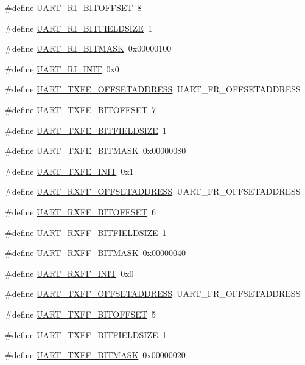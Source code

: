 \begin{DoxyCompactItemize}
\item 
\#define \hyperlink{a00575_a3c027409e7ebbc51bc2b17dec54830dd}{UART\_\-RI\_\-BITOFFSET}~8
\item 
\#define \hyperlink{a00575_a09bf31fcee8b01058706bfc98b5df5fb}{UART\_\-RI\_\-BITFIELDSIZE}~1
\item 
\#define \hyperlink{a00575_aba8c700a8cca6523600a41577cdf3c91}{UART\_\-RI\_\-BITMASK}~0x00000100
\item 
\#define \hyperlink{a00575_acadd1eb0915272c47cf080c968b84084}{UART\_\-RI\_\-INIT}~0x0
\item 
\#define \hyperlink{a00575_a3472eaebc0f1cd3d038f35aa27f2dcbf}{UART\_\-TXFE\_\-OFFSETADDRESS}~UART\_\-FR\_\-OFFSETADDRESS
\item 
\#define \hyperlink{a00575_a01a0be69fed99db0cdbe23e62605e7e4}{UART\_\-TXFE\_\-BITOFFSET}~7
\item 
\#define \hyperlink{a00575_abd6ec8c56f4c7a547fe79ffc24aaaba2}{UART\_\-TXFE\_\-BITFIELDSIZE}~1
\item 
\#define \hyperlink{a00575_af900882c4c51863f8698d414935069f3}{UART\_\-TXFE\_\-BITMASK}~0x00000080
\item 
\#define \hyperlink{a00575_a85598fcf9b8de6fd923107985ac1b7e2}{UART\_\-TXFE\_\-INIT}~0x1
\item 
\#define \hyperlink{a00575_a5336f54af78593f9929462ede1ff6dce}{UART\_\-RXFF\_\-OFFSETADDRESS}~UART\_\-FR\_\-OFFSETADDRESS
\item 
\#define \hyperlink{a00575_afa0faf78e86f805b4d07f023c760bc06}{UART\_\-RXFF\_\-BITOFFSET}~6
\item 
\#define \hyperlink{a00575_a4a26ea73ca1c8e1180add58b53280b44}{UART\_\-RXFF\_\-BITFIELDSIZE}~1
\item 
\#define \hyperlink{a00575_a73d21cf48e50db0772e2fa5d8ec11137}{UART\_\-RXFF\_\-BITMASK}~0x00000040
\item 
\#define \hyperlink{a00575_ad73017c2950a2390597cd46932a8b99e}{UART\_\-RXFF\_\-INIT}~0x0
\item 
\#define \hyperlink{a00575_a9ae7bc9ed3e3600ee6d1ba01d09a1881}{UART\_\-TXFF\_\-OFFSETADDRESS}~UART\_\-FR\_\-OFFSETADDRESS
\item 
\#define \hyperlink{a00575_a39ec320b58ff691e2ef58b16f4c716aa}{UART\_\-TXFF\_\-BITOFFSET}~5
\item 
\#define \hyperlink{a00575_a3014fc1345130c3984ae949886447314}{UART\_\-TXFF\_\-BITFIELDSIZE}~1
\item 
\#define \hyperlink{a00575_a6083f4fe5b9e06516585b47e061745a9}{UART\_\-TXFF\_\-BITMASK}~0x00000020
\item 

\end{DoxyCompactItemize}
